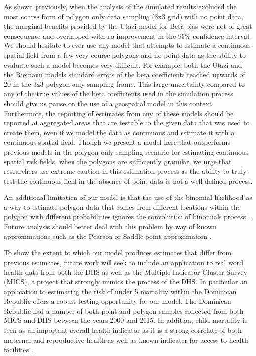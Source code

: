 \documentclass{article}
\begin{document}
As shown previously, when the analysis of the simulated results excluded the most coarse form of polygon only data sampling (3x3 grid) with no point data, the marginal benefits provided by the Utazi model for Beta bias were not of great consequence and overlapped with no improvement in the 95\% confidence interval. We should hesitate to ever use any model that attempts to estimate a continuous spatial field from a few very course polygons and no point data as the ability to evaluate such a model becomes very difficult. For example, both the Utazi and the Riemann models standard errors of the beta coefficients reached upwards of 20 in the 3x3 polygon only sampling frame. This large uncertainty compared to any of the true values of the beta coefficients used in the simulation process should give us pause on the use of a geospatial model in this context. Furthermore, the reporting of estimates from any of these models should be reported at aggregated areas that are testable to the given data that was used to create them, even if we model the data as continuous and estimate it with a continuous spatial field. Though we present a model here that outperforms previous models in the polygon only sampling scenario for estimating continuous spatial risk fields, when the polygons are sufficiently granular, we urge that researchers use extreme caution in this estimation process as the ability to truly test the continuous field in the absence of point data is not a well defined process. 

An additional limitation of our model is that the use of the binomial likelihood as a way to estimate polygon data that comes from different locations within the polygon with different probabilities ignores the convolution of binomials process \cite{Butler1993}. Future analysis should better deal with this problem by way of known approximations such as the Pearson or Saddle point approximation \cite{Liu2017}.

To show the extent to which our model produces estimates that differ from previous estimates, future work will seek to include an application to real word health data from both the DHS as well as the Multiple Indicator Cluster Survey (MICS), a project that strongly mimics the process of the DHS. In particular an application to estimating the risk of under 5 mortality within the Dominican Republic offers a robust testing opportunity for our model. The Dominican Republic had a number of both point and polygon samples collected from both MICS and DHS between the years 2000 and 2015. In addition, child mortality is seen as an important overall health indicator as it is a strong correlate of both maternal and reproductive health as well as known indicator for access to health facilities \cite{AbouZahr2015}.
\end{document}
